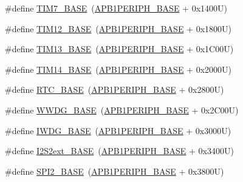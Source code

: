 \begin{DoxyCompactItemize}
\item 
\#define \hyperlink{group___peripheral__memory__map_ga0ebf54364c6a2be6eb19ded6b18b6387}{T\+I\+M7\+\_\+\+B\+A\+SE}~(\hyperlink{group___peripheral__memory__map_ga45666d911f39addd4c8c0a0ac3388cfb}{A\+P\+B1\+P\+E\+R\+I\+P\+H\+\_\+\+B\+A\+SE} + 0x1400\+U)
\item 
\#define \hyperlink{group___peripheral__memory__map_ga33dea32fadbaecea161c2ef7927992fd}{T\+I\+M12\+\_\+\+B\+A\+SE}~(\hyperlink{group___peripheral__memory__map_ga45666d911f39addd4c8c0a0ac3388cfb}{A\+P\+B1\+P\+E\+R\+I\+P\+H\+\_\+\+B\+A\+SE} + 0x1800\+U)
\item 
\#define \hyperlink{group___peripheral__memory__map_gad20f79948e9359125a40bbf6ed063590}{T\+I\+M13\+\_\+\+B\+A\+SE}~(\hyperlink{group___peripheral__memory__map_ga45666d911f39addd4c8c0a0ac3388cfb}{A\+P\+B1\+P\+E\+R\+I\+P\+H\+\_\+\+B\+A\+SE} + 0x1\+C00\+U)
\item 
\#define \hyperlink{group___peripheral__memory__map_ga862855347d6e1d92730dfe17ee8e90b8}{T\+I\+M14\+\_\+\+B\+A\+SE}~(\hyperlink{group___peripheral__memory__map_ga45666d911f39addd4c8c0a0ac3388cfb}{A\+P\+B1\+P\+E\+R\+I\+P\+H\+\_\+\+B\+A\+SE} + 0x2000\+U)
\item 
\#define \hyperlink{group___peripheral__memory__map_ga4265e665d56225412e57a61d87417022}{R\+T\+C\+\_\+\+B\+A\+SE}~(\hyperlink{group___peripheral__memory__map_ga45666d911f39addd4c8c0a0ac3388cfb}{A\+P\+B1\+P\+E\+R\+I\+P\+H\+\_\+\+B\+A\+SE} + 0x2800\+U)
\item 
\#define \hyperlink{group___peripheral__memory__map_ga9a5bf4728ab93dea5b569f5b972cbe62}{W\+W\+D\+G\+\_\+\+B\+A\+SE}~(\hyperlink{group___peripheral__memory__map_ga45666d911f39addd4c8c0a0ac3388cfb}{A\+P\+B1\+P\+E\+R\+I\+P\+H\+\_\+\+B\+A\+SE} + 0x2\+C00\+U)
\item 
\#define \hyperlink{group___peripheral__memory__map_ga8543ee4997296af5536b007cd4748f55}{I\+W\+D\+G\+\_\+\+B\+A\+SE}~(\hyperlink{group___peripheral__memory__map_ga45666d911f39addd4c8c0a0ac3388cfb}{A\+P\+B1\+P\+E\+R\+I\+P\+H\+\_\+\+B\+A\+SE} + 0x3000\+U)
\item 
\#define \hyperlink{group___peripheral__memory__map_gaa5f7b241ed5b756decd835300c9e7bc9}{I2\+S2ext\+\_\+\+B\+A\+SE}~(\hyperlink{group___peripheral__memory__map_ga45666d911f39addd4c8c0a0ac3388cfb}{A\+P\+B1\+P\+E\+R\+I\+P\+H\+\_\+\+B\+A\+SE} + 0x3400\+U)
\item 
\#define \hyperlink{group___peripheral__memory__map_gac3e357b4c25106ed375fb1affab6bb86}{S\+P\+I2\+\_\+\+B\+A\+SE}~(\hyperlink{group___peripheral__memory__map_ga45666d911f39addd4c8c0a0ac3388cfb}{A\+P\+B1\+P\+E\+R\+I\+P\+H\+\_\+\+B\+A\+SE} + 0x3800\+U)

\end{DoxyCompactItemize}
